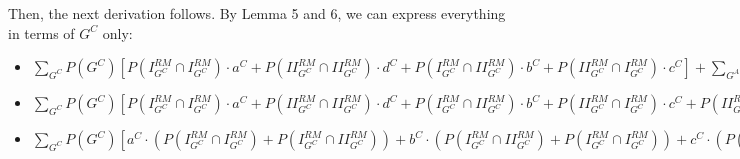 \documentclass[fleqn,reqno,11pt]{article}
\begin{document}
\noindent Then, the next derivation follows. By Lemma 5 and 6, we can express
everything in terms of $G^{C}$ only: 
\begin{itemize}

\item $\sum_{G^{C}}P(G^{C})[P(I_{G^{C}}^{RM}\cap I_{G^{C}}^{RM})\cdot a^{C}+P(II_{G^{C}}^{RM}\cap II_{G^{C}}^{RM})\cdot d^{C}+P(I_{G^{C}}^{RM}\cap II_{G^{C}}^{RM})\cdot b^{C}+P(II_{G^{C}}^{RM}\cap I_{G^{C}}^{RM})\cdot c^{C}]+\sum_{G^{A}}P(G^{A})[P(I_{G^{A}}^{RM}\cap I_{G^{A}}^{RM})\cdot a^{A}+P(II_{G^{A}}^{RM}\cap II_{G^{A}}^{RM})\cdot d^{A}+P(I_{G^{A}}^{RM}\cap II_{G^{A}}^{RM})\cdot b^{A}+P(II_{G^{A}}^{RM}\cap I_{G^{A}}^{RM})\cdot c^{A}] > \sum_{G^{C}}P(G^{C})[P(I_{G^{C}}^{RM}\cap I_{G^{C}}^{MM})\cdot a^{C}+P(II_{G^{C}}^{RM}\cap II_{G^{C}}^{MM})\cdot d^{C}+P(I_{G^{C}}^{RM}\cap II_{G^{C}}^{MM})\cdot c^{C}+P(II_{G^{C}}^{RM}\cap I_{G^{C}}^{MM})\cdot b^{C}]+\sum_{G^{A}}P(G^{A})[P(I_{G^{A}}^{RM}\cap I_{G^{A}}^{MM})\cdot a^{A}+P(II_{G^{A}}^{RM}\cap II_{G^{A}}^{MM})\cdot d^{A}+P(I_{G^{A}}^{RM}\cap II_{G^{A}}^{MM})\cdot c^{A}+P(II_{G^{A}}^{RM}\cap I_{G^{A}}^{MM})\cdot b^{A}]$

\item $\sum_{G^{C}}P(G^{C})[P(I_{G^{C}}^{RM}\cap I_{G^{C}}^{RM})\cdot a^{C}+P(II_{G^{C}}^{RM}\cap II_{G^{C}}^{RM})\cdot d^{C}+P(I_{G^{C}}^{RM}\cap II_{G^{C}}^{RM})\cdot b^{C}+P(II_{G^{C}}^{RM}\cap I_{G^{C}}^{RM})\cdot c^{C} +P(II_{G^{C}}^{RM}\cap II_{G^{C}}^{RM})\cdot c^{C}+P(I_{G^{C}}^{RM}\cap I_{G^{C}}^{RM})\cdot b^{C}+P(II_{G^{C}}^{RM}\cap I_{G^{C}}^{RM})\cdot d^{C}+P(I_{G^{C}}^{RM}\cap II_{G^{C}}^{RM})\cdot a^{C}] > \sum_{G^{C}}P(G^{C})[P(I_{G^{C}}^{RM}\cap I_{G^{C}}^{MM})\cdot a^{C}+P(II_{G^{C}}^{RM}\cap II_{G^{C}}^{MM})\cdot d^{C}+P(I_{G^{C}}^{RM}\cap II_{G^{C}}^{MM})\cdot c^{C}+P(II_{G^{C}}^{RM}\cap I_{G^{C}}^{MM})\cdot b^{C}+P(II_{G^{C}}^{RM}\cap II_{G^{C}}^{MM})\cdot c^{C}+P(I_{G^{C}}^{RM}\cap I_{G^{C}}^{MM})\cdot b^{C}+P(II_{G^{C}}^{RM}\cap I_{G^{C}}^{MM})\cdot a^{C}+P(I_{G^{C}}^{RM}\cap II_{G^{C}}^{MM})\cdot d^{C}]$

\item $\sum_{G^{C}}P(G^{C})[a^{C} \cdot (P(I_{G^{C}}^{RM}\cap I_{G^{C}}^{RM}) + P(I_{G^{C}}^{RM}\cap II_{G^{C}}^{RM})) + b^{C} \cdot  (P(I_{G^{C}}^{RM}\cap II_{G^{C}}^{RM}) + P(I_{G^{C}}^{RM}\cap I_{G^{C}}^{RM})) + c^{C} \cdot (P(II_{G^{C}}^{RM}\cap I_{G^{C}}^{RM}) +P(II_{G^{C}}^{RM}\cap II_{G^{C}}^{RM})) + d^{C} \cdot (P(II_{G^{C}}^{RM}\cap II_{G^{C}}^{RM})+P(II_{G^{C}}^{RM}\cap I_{G^{C}}^{RM}))]> \sum_{G^{C}}P(G^{C})[a^{C} \cdot (P(I_{G^{C}}^{RM}\cap I_{G^{C}}^{MM})+P(II_{G^{C}}^{RM}\cap I_{G^{C}}^{MM})) + b^{C} \cdot (P(II_{G^{C}}^{RM}\cap I_{G^{C}}^{MM})+P(I_{G^{C}}^{RM}\cap I_{G^{C}}^{MM})) + c^{C} \cdot (P(I_{G^{C}}^{RM}\cap II_{G^{C}}^{MM})+P(II_{G^{C}}^{RM}\cap II_{G^{C}}^{MM})) + d^{C} \cdot (P(II_{G^{C}}^{RM}\cap II_{G^{C}}^{MM})+P(I_{G^{C}}^{RM}\cap II_{G^{C}}^{MM}))]$

\end{itemize}
\end{document}
